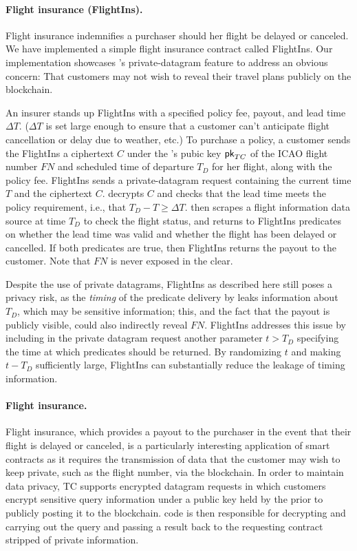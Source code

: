 \paragraph{Flight insurance ({\sf FlightIns}).} Flight insurance indemnifies a purchaser should her flight be delayed or canceled. We have implemented a simple flight insurance contract called {\sf FlightIns}. Our implementation showcases \tc's private-datagram feature to address an obvious concern:  That customers may not wish to reveal their travel plans publicly on the blockchain. 

An insurer stands up {\sf FlightIns} with a specified policy fee, payout, and lead time $\Delta T$. ($\Delta T$ is set large enough to ensure that a customer can't anticipate flight cancellation or delay due to weather, etc.) To purchase a policy, a customer sends the {\sf FlightIns} a ciphertext  $C$ under the \tc's pubic key ${\sf pk}_{TC}$ of the ICAO flight number $FN$ and scheduled time of departure $T_D$ for her flight, along with the policy fee. {\sf FlightIns} sends \tc a private-datagram request containing the current time $T$ and the ciphertext $C$. \tc decrypts $C$ and checks that the lead time meets the policy requirement, i.e., that $T_D - T \geq \Delta T$. \tc then scrapes a flight information data source at time $T_D$ to check the flight status, and returns to {\sf FlightIns} predicates on whether the lead time was valid and whether the flight has been delayed or cancelled. If both predicates are true, then {\sf FlightIns} returns the payout to the customer. Note that $FN$ is never exposed in the clear.

Despite the use of private datagrams, {\sf FlightIns} as described here still poses a privacy risk, as the {\em timing} of the predicate delivery by \tc leaks information about $T_D$, which may be sensitive information; this, and the fact that the payout is publicly visible, could also indirectly reveal $FN$. {\sf FlightIns} addresses this issue by including in the private datagram request another parameter $t > T_D$ specifying the time at which predicates should be returned. By randomizing $t$ and making $t - T_D$ sufficiently large, {\sf FlightIns} can substantially reduce the leakage of timing information. 

\iffalse
\paragraph{Flight insurance.} Flight insurance, which provides a payout to the purchaser in the event that their flight is delayed or canceled, is a particularly interesting application of smart contracts as it requires  the transmission of data that the customer may wish to keep private, such as the flight number, via the blockchain.  In order to maintain data privacy, TC supports encrypted datagram requests in which customers encrypt sensitive query information under a public key held by the \encname prior to publicly posting it to the blockchain.  \encname code is then responsible for decrypting and carrying out the query and passing a result back to the requesting contract stripped of private information.  

